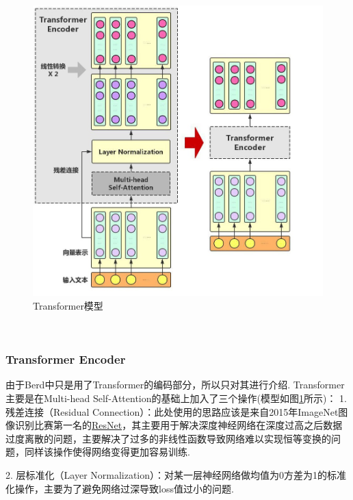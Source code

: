 \documentclass[12pt, a4paper, oneside]{ctexart}
\numberwithin{equation}{section}  %
\begin{document}
\vspace{1.5cm}
\begin{figure}
\centering
\includegraphics[scale=0.4]{../NLP大作业note.figure/Transformer.jpg}
\caption{Transformer模型}
\label{fig-transformer}
\end{figure}
\ \vspace{3.5cm}

\subsubsection{Transformer Encoder}
由于Berd中只是用了Transformer的编码部分，所以只对其进行介绍.
Transformer主要是在Multi-head Self-Attention的基础上加入了三个操作(模型如图\ref{fig-transformer}所示)：
1. 残差连接（Residual Connection）：此处使用的思路应该是来自2015年ImageNet图像识别比赛第一名的\href{https://arxiv.org/abs/1512.03385}{ResNet}，其主要用于解决深度神经网络在深度过高之后数据过度离散的问题，主要解决了过多的非线性函数导致网络难以实现恒等变换的问题，同样该操作使得网络变得更加容易训练.

2. 层标准化（Layer Normalization）：对某一层神经网络做均值为0方差为1的标准化操作，主要为了避免网络过深导致loss值过小的问题.
\end{document}
